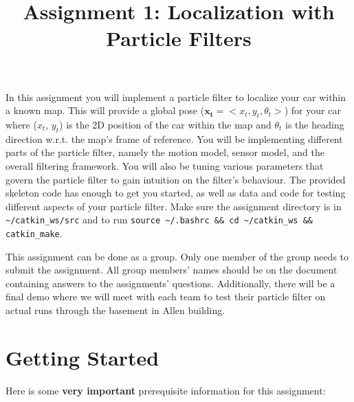 \documentclass[final]{article}
\title{Assignment 1: Localization with Particle Filters}
\begin{document}

\maketitle

In this assignment you will implement a particle filter to localize your car within a known map. This will provide a global pose ($\mathbf{x_t} = <x_t, y_t, \theta_t>$) for your car where ($x_t$, $y_t$) is the 2D position of the car within the map and $\theta_t$ is the heading direction w.r.t. the map's frame of reference. You will be implementing different parts of the particle filter, namely the motion model, sensor model, and the overall filtering framework. You will also be tuning various parameters that govern the particle filter to gain intuition on the filter's behaviour. The provided skeleton code has enough to get you started, as well as data and code for testing different aspects of your particle filter. Make sure the assignment directory is in \texttt{\textasciitilde/catkin\_ws/src} and to run \texttt{source \textasciitilde/.bashrc \&\& cd \textasciitilde/catkin\_ws \&\& catkin\_make}.

This assignment can be done as a group. Only one member of the group needs to submit the assignment. All group members' names should be on the document containing answers to the assignments' questions. Additionally, there will be a final demo where we will meet with each team to test their particle filter on actual runs through the basement in Allen building.

\section{Getting Started}

Here is some \textbf{very important} prerequisite information for this assignment:
\end{document}
